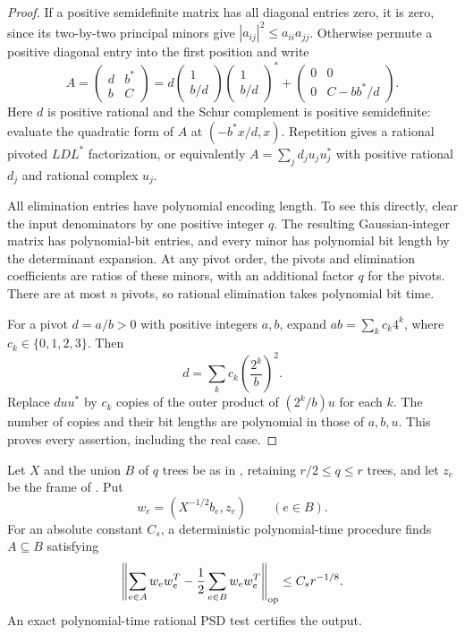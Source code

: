 \begin{proof}
If a positive semidefinite matrix has all diagonal entries zero, it is
zero, since its two-by-two principal minors give
$|a_{ij}|^2\le a_{ii}a_{jj}$.  Otherwise permute a positive diagonal
entry into the first position and write
\[
 A=\begin{pmatrix}d&b^*\\ b&C\end{pmatrix}
  =d\begin{pmatrix}1\\b/d\end{pmatrix}
       \begin{pmatrix}1\\b/d\end{pmatrix}^{\!*}
       +\begin{pmatrix}0&0\\0&C-bb^*/d\end{pmatrix}.
\]
Here $d$ is positive rational and the Schur complement is positive
semidefinite: evaluate the quadratic form of $A$ at
$(-b^*x/d,x)$.  Repetition gives a rational pivoted $LDL^*$
factorization, or equivalently $A=\sum_j d_j u_ju_j^*$ with positive
rational $d_j$ and rational complex $u_j$.

All elimination entries have polynomial encoding length.  To see this
directly, clear the input denominators by one positive integer $q$.
The resulting Gaussian-integer matrix has polynomial-bit entries,
and every minor has polynomial bit length by the determinant
expansion.  At any pivot order, the pivots and elimination coefficients
are ratios of these minors, with an additional factor $q$ for the
pivots.  There are at most $n$ pivots, so rational elimination takes
polynomial bit time.

For a pivot $d=a/b>0$ with positive integers $a,b$, expand
$ab=\sum_k c_k4^k$, where $c_k\in\{0,1,2,3\}$.  Then
\[
                 d=\sum_k c_k\left(\frac{2^k}{b}\right)^2.
\]
Replace $d u u^*$ by $c_k$ copies of the outer product of
$(2^k/b)u$ for each $k$.  The number of copies and their bit lengths
are polynomial in those of $a,b,u$.  This proves every assertion,
including the real case.
\end{proof}


\begin{lemma}
\label{lem:ta-signing}
Let $X$ and the union $B$ of $q$ trees be as in
, retaining $r/2\le q\le r$ trees, and let
$z_e$ be the frame of . Put
\begin{equation}
                   w_e=(X^{-1/2}b_e,z_e)\qquad(e\in B).
 \label{eq:ta-stacked}
\end{equation}
For an absolute constant $C_s$, a deterministic polynomial-time procedure
finds $A\subseteq B$ satisfying
\begin{equation}
 \left\|\sum_{e\in A}w_ew_e^T
                    -\frac12\sum_{e\in B}w_ew_e^T\right\|_{\mathrm{op}}
                          \le C_s r^{-1/8}.
 \label{eq:ta-half-frame}
\end{equation}
An exact polynomial-time rational PSD test certifies the output.
\end{lemma}

